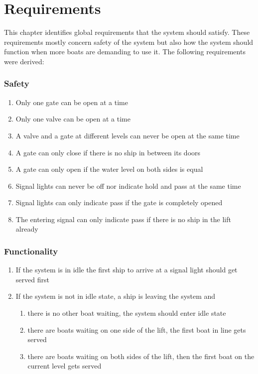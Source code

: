 \section{Requirements}
This chapter identifies global requirements that the system should satisfy. These requirements mostly concern safety of the system but also how the system should function when more boats are demanding to use it. The following requirements were derived:

\subsubsection*{Safety}
\begin{enumerate}
	\item Only one gate can be open at a time
	\item Only one valve can be open at a time
	\item A valve and a gate at different levels can never be open at the same time
	\item A gate can only close if there is no ship in between its doors
	\item A gate can only open if the water level on both sides is equal
	\item Signal lights can never be off nor indicate hold and pass at the same time
	\item Signal lights can only indicate pass if the gate is completely opened
	\item The entering signal can only indicate pass if there is no ship in the lift already
\end{enumerate}

\subsubsection*{Functionality}
\begin{enumerate}
	\item If the system is in idle the first ship to arrive at a signal light should get served first
	\item If the system is not in idle state, a ship is leaving the system and
	\begin{enumerate}
		\item there is no other boat waiting, the system should enter idle state
		\item there are boats waiting on one side of the lift, the first boat in line gets served 
		\item there are boats waiting on both sides of the lift, then the first boat on the current level gets served
	\end{enumerate}
\end{enumerate}
